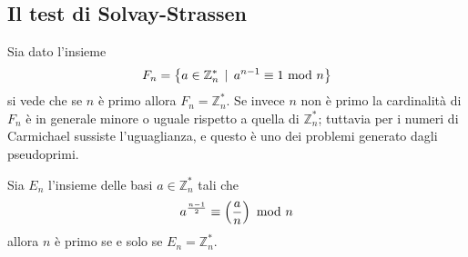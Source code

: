 



\subsection{Il test di Solvay-Strassen}
\begin{osservazione}
	Sia dato l'insieme
	\begin{equation*}
	F_n=\left\{a\in\mathbb{Z}_n^* \, \mid \, a^{n-1}\equiv1\ \mathrm{mod}\ n\right\}
	\end{equation*}
	si vede che se $n$ è primo allora $F_n=\mathbb{Z}_n^*$. Se invece $n$ non è primo la cardinalità di $F_n$ è in generale minore o uguale rispetto a quella di $\mathbb{Z}_n^*$; tuttavia per i numeri di Carmichael sussiste l'uguaglianza, e questo è uno dei problemi generato dagli pseudoprimi.
\end{osservazione}
\begin{teorema}
	Sia $E_n$ l'insieme delle basi $a\in\mathbb{Z}_n^*$ tali che 
	\begin{equation*}
	a^{\frac{n-1}{2}}\equiv\left(\frac{a}{n}\right)\ \mathrm{mod}\ n
	\end{equation*}
	allora $n$ è primo se e solo se $E_n=\mathbb{Z}_n^*$.
\end{teorema}
